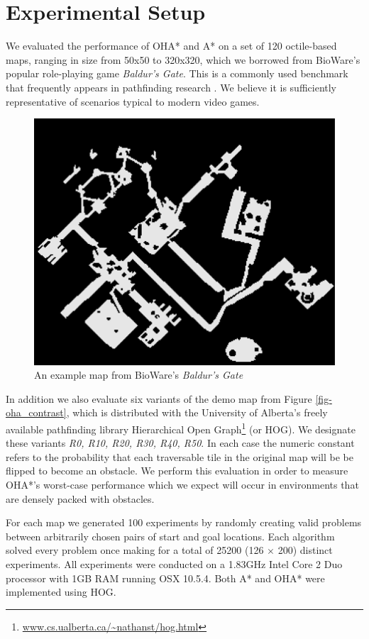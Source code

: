 \section{Experimental Setup}
We evaluated the performance of OHA* and A* on a set of 120 octile-based maps, ranging in size from 50x50 
to 320x320, which we borrowed from BioWare's popular role-playing game \emph{Baldur's Gate}. 
This is a commonly used benchmark that frequently appears in pathfinding research 
\cite{botea04,bjornsson05,bjornsson06,sturtevant05,harabor08}.
We believe it is sufficiently representative of scenarios typical to modern video games. 
\begin{figure}[htbp]
       \begin{center}
                       \includegraphics[scale=0.50, trim = 10mm 10mm 10mm 0mm]{diagrams/bgmap.png}
       \end{center}
	\vspace{-3pt}
       \caption{An example map from BioWare's \emph{Baldur's Gate}}
       \label{fig-bgmap}
	\vspace{-12pt}
\end{figure}
In addition we also evaluate six variants of the demo map from Figure \ref{fig-oha_contrast},
 which is distributed with the University of Alberta's freely available pathfinding library 
Hierarchical Open Graph\footnote{\url{www.cs.ualberta.ca/~nathanst/hog.html}} (or HOG).
We designate these variants \emph{R0, R10, R20, R30, R40, R50}.
In each case the numeric constant refers to the probability that each traversable tile 
in the original map will be be flipped to become an obstacle.
We perform this evaluation in order to measure OHA*'s worst-case performance which we expect will occur in 
environments that are densely packed with obstacles.
\par
For each map we generated 100 experiments by randomly creating valid problems between arbitrarily chosen 
pairs of start and goal locations.
Each algorithm solved every problem once making for a total of 25200 (126 $\times$ 200) distinct experiments.
All experiments were conducted on a 1.83GHz Intel Core 2 Duo processor with 1GB RAM running OSX 10.5.4.
Both A* and OHA* were implemented using HOG. 
